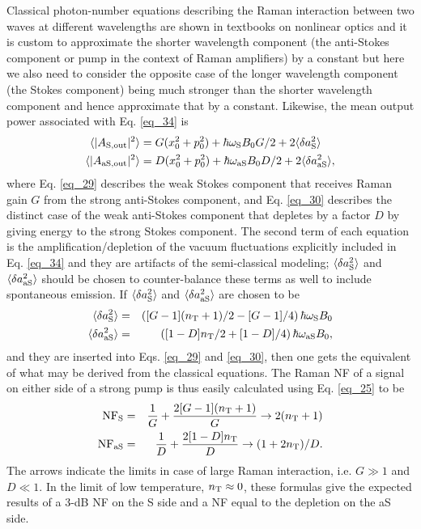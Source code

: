 \documentclass[10pt,letterpaper]{article}
\begin{document}
Classical photon-number equations describing the Raman interaction between two waves at different wavelengths are shown in textbooks on nonlinear optics \cite{Rottwitt2015_bog} and it is custom to approximate the shorter wavelength component (the anti-Stokes component or pump in the context of Raman amplifiers) by a constant but here we also need to consider the opposite case of the longer wavelength component (the Stokes component) being much stronger than the shorter wavelength component and hence approximate that by a constant. Likewise, the mean output power associated with Eq. \eqref{eq_34} is
\begin{align} \label{eq_29}
\langle |A_{\rm S, out}|^2\rangle &= G(x_0^2 + p_0^2) + \hbar \omega_{\rm S}B_0 G/2 + 2\langle \delta a_{\rm S}^2 \rangle  \\
\langle |A_{\rm aS, out}|^2\rangle &= D(x_0^2 + p_0^2) + \hbar \omega_{\rm aS}B_0 D/2 + 2\langle \delta a_{\rm aS}^2 \rangle, \label{eq_30} 
\end{align}
where Eq. \eqref{eq_29} describes the weak Stokes component that receives Raman gain $G$ from the strong anti-Stokes component, and Eq. \eqref{eq_30} describes the distinct case of the weak anti-Stokes component that depletes by a factor $D$ by giving energy to the strong Stokes component. The second term of each equation is the amplification/depletion of the vacuum fluctuations explicitly included in Eq. \eqref{eq_34} and they are artifacts of the semi-classical modeling; $\langle \delta a_{\rm S}^2 \rangle$ and $\langle \delta a_{\rm aS}^2 \rangle$ should be chosen to counter-balance these terms as well to include spontaneous emission. If $\langle \delta a_{\rm S}^2 \rangle$ and $\langle \delta a_{\rm aS}^2 \rangle$ are chosen to be
\begin{eqnarray}
\langle \delta a_{\rm S}^2 \rangle &=& \left([ G-1](n_{\rm T}+1)/2 - [G-1]/4\right) \hbar \omega_{\rm S}B_0\\
\langle \delta a_{\rm aS}^2 \rangle &=& \left([1-D]n_{\rm T}/2 + [1-D]/4\right) \hbar \omega_{\rm aS}B_0,
\end{eqnarray} 
and they are inserted into Eqs. \eqref{eq_29} and \eqref{eq_30}, then one gets the equivalent of what may be derived from the classical equations. The Raman NF of a signal on either side of a strong pump is thus easily calculated using Eq. \eqref{eq_25} to be
\begin{eqnarray} \label{eq_38}
{ \rm NF_{\rm S}} &=& \frac{1}{G}+ \frac{2[G-1](n_{\rm T}+1)}{G} \rightarrow 2(n_{\rm T}+1)\\
{\rm NF_{\rm aS}} &=& \frac{1}{D}+ \frac{2[1-D]n_{\rm T}}{D}\rightarrow (1+2n_{\rm T})/D. \label{eq_39}
\end{eqnarray}
The arrows indicate the limits in case of large Raman interaction, i.e. $G \gg 1$ and $D \ll 1$. In the limit of low temperature, $n_{\rm T} \approx 0$, these formulas give the expected results of a 3-dB NF on the S side and a NF equal to the depletion on the aS side.
\end{document}
